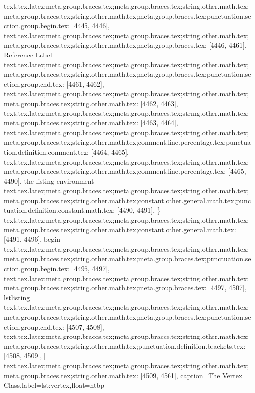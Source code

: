 {{{{{{{{{{{{{{{{{{{{{{{{{{{{{{{{{{{{{{{{{{{{{{{{{{{{{{{{{{{{{{{{{{{{{{{{{{{{{{{{{{{{{{{{{{{{{{{{{{{{{{{{{{{{{{{{{{{{{{{{{{{{{{{{{{{{{{{{{{{{{text.tex.latex;meta.group.braces.tex;meta.group.braces.tex;string.other.math.tex;meta.group.braces.tex;string.other.math.tex;meta.group.braces.tex;punctuation.section.group.begin.tex: [4445, 4446], {{}
text.tex.latex;meta.group.braces.tex;meta.group.braces.tex;string.other.math.tex;meta.group.braces.tex;string.other.math.tex;meta.group.braces.tex: [4446, 4461], {Reference Label}
text.tex.latex;meta.group.braces.tex;meta.group.braces.tex;string.other.math.tex;meta.group.braces.tex;string.other.math.tex;meta.group.braces.tex;punctuation.section.group.end.tex: [4461, 4462], {}}
text.tex.latex;meta.group.braces.tex;meta.group.braces.tex;string.other.math.tex;meta.group.braces.tex;string.other.math.tex: [4462, 4463], {
}
text.tex.latex;meta.group.braces.tex;meta.group.braces.tex;string.other.math.tex;meta.group.braces.tex;string.other.math.tex: [4463, 4464], {
}
text.tex.latex;meta.group.braces.tex;meta.group.braces.tex;string.other.math.tex;meta.group.braces.tex;string.other.math.tex;comment.line.percentage.tex;punctuation.definition.comment.tex: [4464, 4465], {%
text.tex.latex;meta.group.braces.tex;meta.group.braces.tex;string.other.math.tex;meta.group.braces.tex;string.other.math.tex;comment.line.percentage.tex: [4465, 4490], { the listing environment
}
text.tex.latex;meta.group.braces.tex;meta.group.braces.tex;string.other.math.tex;meta.group.braces.tex;string.other.math.tex;constant.other.general.math.tex;punctuation.definition.constant.math.tex: [4490, 4491], {\}
text.tex.latex;meta.group.braces.tex;meta.group.braces.tex;string.other.math.tex;meta.group.braces.tex;string.other.math.tex;constant.other.general.math.tex: [4491, 4496], {begin}
text.tex.latex;meta.group.braces.tex;meta.group.braces.tex;string.other.math.tex;meta.group.braces.tex;string.other.math.tex;meta.group.braces.tex;punctuation.section.group.begin.tex: [4496, 4497], {{}
text.tex.latex;meta.group.braces.tex;meta.group.braces.tex;string.other.math.tex;meta.group.braces.tex;string.other.math.tex;meta.group.braces.tex: [4497, 4507], {lstlisting}
text.tex.latex;meta.group.braces.tex;meta.group.braces.tex;string.other.math.tex;meta.group.braces.tex;string.other.math.tex;meta.group.braces.tex;punctuation.section.group.end.tex: [4507, 4508], {}}
text.tex.latex;meta.group.braces.tex;meta.group.braces.tex;string.other.math.tex;meta.group.braces.tex;string.other.math.tex;punctuation.definition.brackets.tex: [4508, 4509], {[}
text.tex.latex;meta.group.braces.tex;meta.group.braces.tex;string.other.math.tex;meta.group.braces.tex;string.other.math.tex: [4509, 4561], {caption=The Vertex Class,label=lst:vertex,float=htbp}
}}}}}}}}}}}}}}}}}}}}}}}}}}}}}}}}}}}}}}}}}}}}}}}}}}}}}}}}}}}}}}}}}}}}}}}}}}}}}}}}}}}}}}}}}}}}}}}}}}}}}}}}}}}}}}}}}}}}}}}}}}}}}}}}}}}}}}}}}}}}}}}
